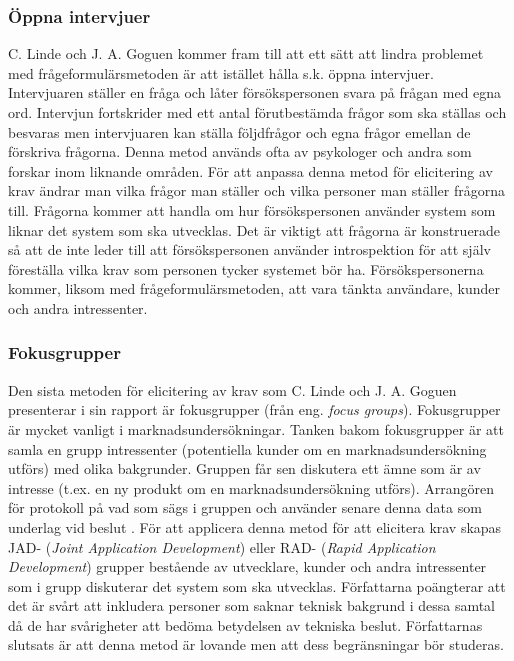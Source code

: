 \subsubsection{Öppna intervjuer} 
 C. Linde och J. A. Goguen kommer fram till att ett sätt att lindra problemet med frågeformulärsmetoden är att istället hålla s.k. öppna intervjuer. Intervjuaren ställer en fråga och låter försökspersonen svara på frågan med egna ord. Intervjun fortskrider med ett antal förutbestämda frågor som ska ställas och besvaras men intervjuaren kan ställa följdfrågor och egna frågor emellan de förskriva frågorna. Denna metod används ofta av psykologer och andra som forskar inom liknande områden. För att anpassa denna metod för elicitering av krav ändrar man vilka frågor man ställer och vilka personer man ställer frågorna till. Frågorna kommer att handla om hur försökspersonen använder system som liknar det system som ska utvecklas. Det är viktigt att frågorna är konstruerade så att de inte leder till att försökspersonen använder introspektion för att själv föreställa vilka krav som personen tycker systemet bör ha. Försökspersonerna kommer, liksom med frågeformulärsmetoden, att vara tänkta användare, kunder och andra intressenter. 

\subsubsection{Fokusgrupper}
Den sista metoden för elicitering av krav som C. Linde och J. A. Goguen presenterar i sin rapport är fokusgrupper (från eng. \textit{focus groups}). Fokusgrupper är mycket vanligt i marknadsundersökningar. Tanken bakom fokusgrupper är att samla en grupp intressenter (potentiella kunder om en marknadsundersökning utförs) med olika bakgrunder. Gruppen får sen diskutera ett ämne som är av intresse (t.ex. en ny produkt om en marknadsundersökning utförs). Arrangören för protokoll på vad som sägs i gruppen och använder senare denna data som underlag vid beslut \cite{hylander1998fokusgrupper}. För att applicera denna metod för att elicitera krav skapas JAD- (\textit{Joint Application Development}) eller RAD- (\textit{Rapid Application Development}) grupper bestående av utvecklare, kunder och andra intressenter som i grupp diskuterar det system som ska utvecklas. Författarna poängterar att det är svårt att inkludera personer som saknar teknisk bakgrund i dessa samtal då de har svårigheter att bedöma betydelsen av tekniska beslut. Författarnas slutsats är att denna metod är lovande men att dess begränsningar bör studeras. 

